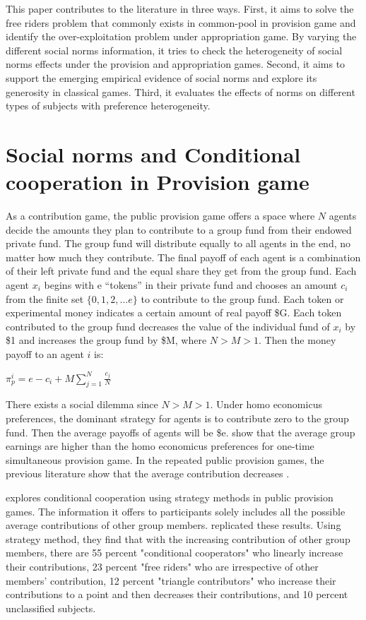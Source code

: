\documentclass[12pt]{article}
\begin{document}
This paper contributes to the literature in three ways. First, it aims to solve the free riders problem that commonly exists in common-pool in provision game and identify the over-exploitation problem under appropriation game. By varying the different social norms information, it tries to check the heterogeneity of social norms effects under the provision and appropriation games. Second, it aims to support the emerging empirical evidence of social norms and explore its generosity in classical games. Third, it evaluates the effects of norms on different types of subjects with preference heterogeneity. 


\section{Social norms and Conditional cooperation in Provision game}

As a contribution game, the public provision game offers a space where $N$ agents decide the amounts they plan to contribute to a group fund from their endowed private fund. The group fund will distribute equally to all agents in the end, no matter how much they contribute. The final payoff of each agent is a combination of their left private fund and the equal share they get from the group fund. Each agent $x_i$ begins with e “tokens” in their private fund and chooses an amount $c_i$ from the finite set $ \{ 0, 1, 2, … e \}$ to contribute to the group fund. Each token or experimental money indicates a certain amount of real payoff \$G. Each token contributed to the group fund decreases the value of the individual fund of $x_i$ by \$1 and increases the group fund by \$M, where $N>M>1$. Then the money payoff to an agent $i$ is:

\begin{center}
$
\pi_p^i = e - c_i + M \sum^N_{j=1} \frac{c_j}{N}
$
\end{center}

There exists a social dilemma since $N>M>1$. Under homo economicus preferences, the dominant strategy for agents is to contribute zero to the group fund. Then the average payoffs of agents will be \$e. \cite{cox2013provision} show that the average group earnings are higher than the homo economicus preferences for one-time simultaneous provision game. In the repeated public provision games, the previous literature show that the average contribution decreases \citep{fischbacher2010social, kandul2021public}.

\cite{fischbacher2001people} explores conditional cooperation using strategy methods in public provision games. The information it offers to participants solely includes all the possible average contributions of other group members. \cite{fischbacher2010social} replicated these results. Using strategy method, they find that with the increasing contribution of other group members, there are 55 percent "conditional cooperators" who linearly increase their contributions, 23 percent "free riders" who are irrespective of other members' contribution, 12 percent "triangle contributors" who increase their contributions to a point and then decreases their contributions, and 10 percent unclassified subjects.
\end{document}
